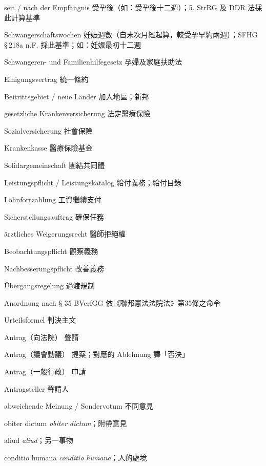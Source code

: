 \documentclass[12pt]{article}
\begin{document}
\begin{termbox}
\begin{termcolumns}
\begin{termitems}
\item[seit / nach der Empfängnis] 受孕後（如：受孕後十二週）；5. StrRG 及 DDR 法採此計算基準
\item[Schwangerschaftswochen] 妊娠週數（自末次月經起算，較受孕早約兩週）；SFHG §\,218a n.F. 採此基準；如：妊娠最初十二週
\item[Schwangeren- und Familienhilfegesetz] 孕婦及家庭扶助法
\item[Einigungsvertrag] 統一條約
\item[Beitrittsgebiet / neue Länder] 加入地區；新邦
\item[gesetzliche Krankenversicherung] 法定醫療保險
\item[Sozialversicherung] 社會保險
\item[Krankenkasse] 醫療保險基金
\item[Solidargemeinschaft] 團結共同體
\item[Leistungspflicht / Leistungskatalog] 給付義務；給付目錄
\item[Lohnfortzahlung] 工資繼續支付
\item[Sicherstellungsauftrag] 確保任務
\item[ärztliches Weigerungsrecht] 醫師拒絕權
\item[Beobachtungspflicht] 觀察義務
\item[Nachbesserungspflicht] 改善義務
\item[Übergangsregelung] 過渡規制
\item[Anordnung nach § 35 BVerfGG] 依《聯邦憲法法院法》第35條之命令
\item[Urteilsformel] 判決主文
\item[Antrag（向法院）] 聲請
\item[Antrag（議會動議）] 提案；對應的 Ablehnung 譯「否決」
\item[Antrag（一般行政）] 申請
\item[Antragsteller] 聲請人
\item[abweichende Meinung / Sondervotum] 不同意見
\item[obiter dictum] \textit{obiter dictum}；附帶意見
\item[aliud] \textit{aliud}；另一事物
\item[conditio humana] \textit{conditio humana}；人的處境
\end{termitems}
\end{termcolumns}


\end{termbox}
\end{document}
